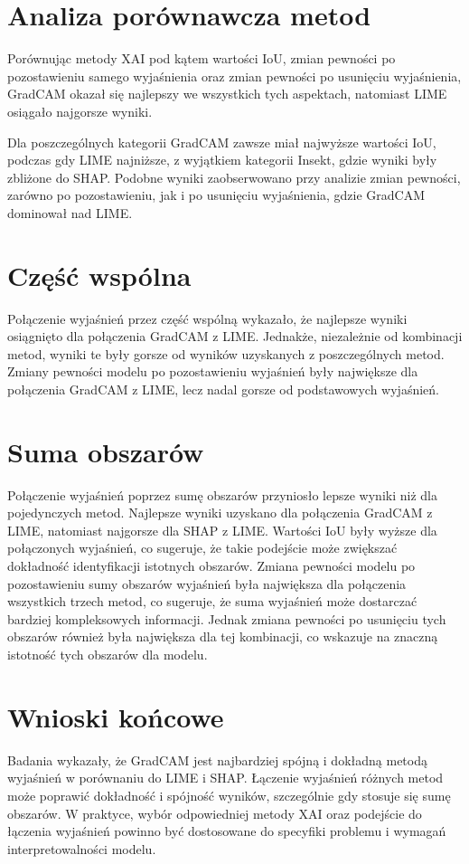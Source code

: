 \section*{Analiza porównawcza metod}

Porównując metody XAI pod kątem wartości IoU, zmian pewności po pozostawieniu samego wyjaśnienia oraz zmian pewności po usunięciu wyjaśnienia, GradCAM okazał się najlepszy we wszystkich tych aspektach, natomiast LIME osiągało najgorsze wyniki.

Dla poszczególnych kategorii GradCAM zawsze miał najwyższe wartości IoU, podczas gdy LIME najniższe, z wyjątkiem kategorii Insekt, gdzie wyniki były zbliżone do SHAP.
Podobne wyniki zaobserwowano przy analizie zmian pewności, zarówno po pozostawieniu, jak i po usunięciu wyjaśnienia, gdzie GradCAM dominował nad LIME.

\section*{Część wspólna}

Połączenie wyjaśnień przez część wspólną wykazało, że najlepsze wyniki osiągnięto dla połączenia GradCAM z LIME.
Jednakże, niezależnie od kombinacji metod, wyniki te były gorsze od wyników uzyskanych z poszczególnych metod.
Zmiany pewności modelu po pozostawieniu wyjaśnień były największe dla połączenia GradCAM z LIME, lecz nadal gorsze od podstawowych wyjaśnień.

\section*{Suma obszarów}

Połączenie wyjaśnień poprzez sumę obszarów przyniosło lepsze wyniki niż dla pojedynczych metod.
Najlepsze wyniki uzyskano dla połączenia GradCAM z LIME, natomiast najgorsze dla SHAP z LIME.
Wartości IoU były wyższe dla połączonych wyjaśnień, co sugeruje, że takie podejście może zwiększać dokładność identyfikacji istotnych obszarów.
Zmiana pewności modelu po pozostawieniu sumy obszarów wyjaśnień była największa dla połączenia wszystkich trzech metod, co sugeruje, że suma wyjaśnień może dostarczać bardziej kompleksowych informacji.
Jednak zmiana pewności po usunięciu tych obszarów również była największa dla tej kombinacji, co wskazuje na znaczną istotność tych obszarów dla modelu.

\section*{Wnioski końcowe}

Badania wykazały, że GradCAM jest najbardziej spójną i dokładną metodą wyjaśnień w porównaniu do LIME i SHAP. Łączenie wyjaśnień różnych metod może poprawić dokładność i spójność wyników, szczególnie gdy stosuje się sumę obszarów.
W praktyce, wybór odpowiedniej metody XAI oraz podejście do łączenia wyjaśnień powinno być dostosowane do specyfiki problemu i wymagań interpretowalności modelu.
